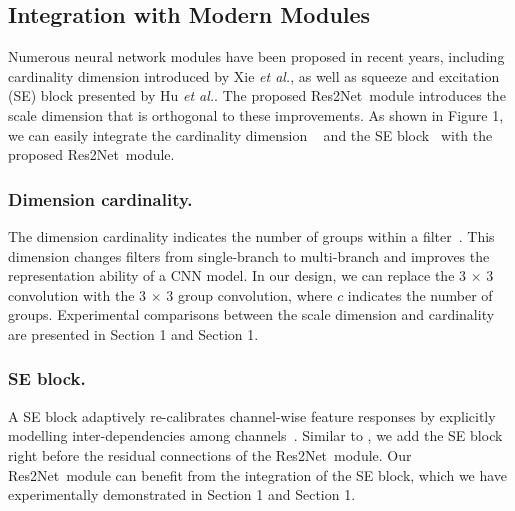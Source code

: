 \documentclass[10pt,journal,cspaper,compsoc]{IEEEtran}
\newcommand{\CheckRmv}[1]{}
\newcommand{\figref}[1]{Figure 1}%
\newcommand{\secref}[1]{Section 1}
\newcommand{\CheckRmv}[1]{#1}
\newcommand{\figref}[1]{Fig.~\ref{#1}}%
\newcommand{\secref}[1]{Sec.~\ref{#1}}
\newcommand{\myPara}[1]{\subsubsection{#1}}
\newcommand{\ourM}{{Res2Net}}
\def\etal{{\em et al.}}
\def\etal{{\em et al.}}
\begin{document}
\subsection{Integration with Modern Modules}

\CheckRmv{
\begin{figure}[t]
  \begin{overpic}[width=\linewidth]{improved_structure.pdf}
  \end{overpic}
  \caption{The \ourM~module can be integrated with
    the dimension cardinality~\cite{xie2017aggregated} (replace conv with group conv)
    and SE~\cite{hu2018senet} blocks.
  }\label{fig:improved_structure}
\end{figure}
}

Numerous neural network modules have been proposed in recent years,
including cardinality dimension introduced by Xie \etal \cite{xie2017aggregated},
as well as squeeze and excitation (SE) block presented by
Hu \etal \cite{hu2018senet}.
%
The proposed \ourM~module introduces the scale dimension
that is orthogonal to  these improvements.
%
As shown in \figref{fig:improved_structure},
we can easily integrate the cardinality dimension ~\cite{xie2017aggregated}
and the SE block~\cite{hu2018senet} with the proposed \ourM~module.
%


\myPara{Dimension cardinality.}
The dimension cardinality indicates the number of groups within a
filter~\cite{xie2017aggregated}.
%
This dimension changes filters from single-branch to multi-branch and
improves the representation ability of a CNN model.
%
In our design, we can replace the 3 $\times$ 3 convolution
with the 3 $\times$ 3 group convolution,
where $c$ indicates the number of groups.
%
Experimental comparisons between the scale dimension and cardinality
are presented in \secref{sec:Experiments_ImageNet} and
\secref{sec:compare_dimentions}.


\myPara{SE block.}
A SE block adaptively re-calibrates channel-wise feature responses
by explicitly modelling inter-dependencies among channels~\cite{hu2018senet}.
%
Similar to \cite{hu2018senet},
we add the SE block right before the residual connections of the \ourM~module.
%
Our \ourM~module can benefit from the integration of the SE block,
which we have experimentally demonstrated in
\secref{sec:Experiments_ImageNet} and \secref{sec:Experiments_CIFAR}.
\end{document}
